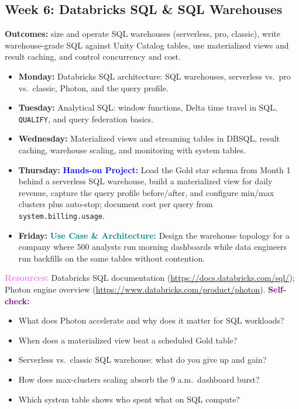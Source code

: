 \documentclass[11pt, a4paper]{article}
\newcommand{\project}[1]{\vspace{1mm}\noindent\textbf{\textcolor{blue}{Hands-on Project:}} #1}
\newcommand{\usecase}[1]{\vspace{1mm}\noindent\textbf{\textcolor{teal}{Use Case \& Architecture:}} #1}
\newcommand{\dayitem}[2]{\item \textbf{#1:} #2}
\newcommand{\resources}[1]{\vspace{1mm}\noindent\textbf{\textcolor{violet}{Resources:}} #1}
\newcommand{\selfcheck}[1]{\vspace{1mm}\noindent\textbf{\textcolor{purple}{Self-check:}} #1}
\begin{document}
\subsection*{Week 6: Databricks SQL \& SQL Warehouses}
\par\noindent\textbf{Outcomes:} size and operate SQL warehouses (serverless, pro, classic), write warehouse-grade SQL against Unity Catalog tables, use materialized views and result caching, and control concurrency and cost.
\begin{itemize}[label=-]
    \dayitem{Monday}{Databricks SQL architecture: SQL warehouses, serverless vs.\ pro vs.\ classic, Photon, and the query profile.}
    \dayitem{Tuesday}{Analytical SQL: window functions, Delta time travel in SQL, \texttt{QUALIFY}, and query federation basics.}
    \dayitem{Wednesday}{Materialized views and streaming tables in DBSQL, result caching, warehouse scaling, and monitoring with system tables.}
    \dayitem{Thursday}{\project{Load the Gold star schema from Month 1 behind a serverless SQL warehouse, build a materialized view for daily revenue, capture the query profile before/after, and configure min/max clusters plus auto-stop; document cost per query from \texttt{system.billing.usage}.}}
    \dayitem{Friday}{\usecase{Design the warehouse topology for a company where 500 analysts run morning dashboards while data engineers run backfills on the same tables without contention.}}
\end{itemize}
\resources{Databricks SQL documentation (\url{https://docs.databricks.com/sql/}); Photon engine overview (\url{https://www.databricks.com/product/photon}).}
\selfcheck{\begin{itemize}[label=-, leftmargin=1.5em, itemsep=0pt]
    \item What does Photon accelerate and why does it matter for SQL workloads?
    \item When does a materialized view beat a scheduled Gold table?
    \item Serverless vs.\ classic SQL warehouse: what do you give up and gain?
    \item How does max-clusters scaling absorb the 9 a.m.\ dashboard burst?
    \item Which system table shows who spent what on SQL compute?
\end{itemize}}
\end{document}
